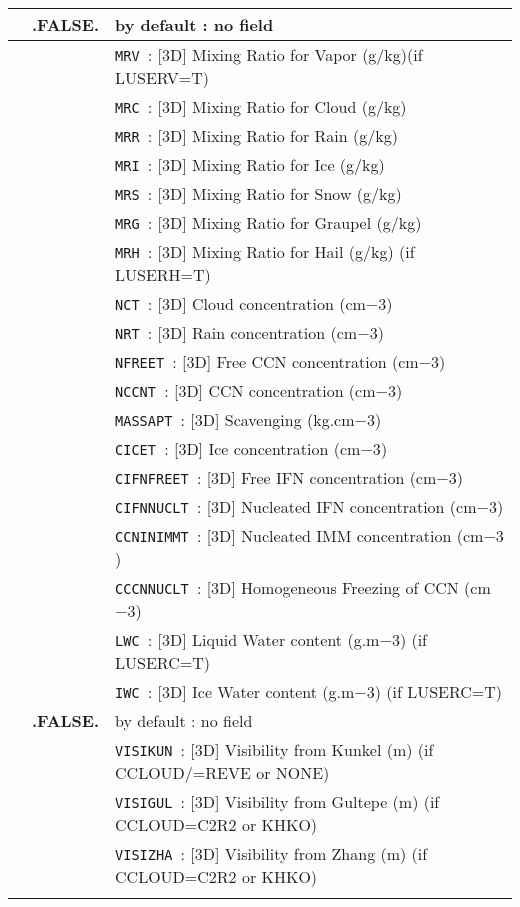\begin{center}
\begin{makeimage}
\begin{tabular}{|>{\centering}p{3cm}|>{\centering}p{2.5cm}|p{11cm}|}
\hline
\multirow{10}{*}{LLIMA\_DIAG}\index{LLIMA\_DIAG!\innam{NAM\_DIAG}}&\textbf{.FALSE.} & by default : no field\\\cline{2-3}
&\multirow{19}{*}{.TRUE.} &{\tt MRV }: [3D] Mixing Ratio for Vapor (g/kg)(if LUSERV=T)\\\cline{3-3}
& &{\tt MRC }: [3D] Mixing Ratio for Cloud (g/kg) \\\cline{3-3}
& &{\tt MRR }: [3D] Mixing Ratio for Rain (g/kg) \\\cline{3-3}
& &{\tt MRI }: [3D] Mixing Ratio for Ice (g/kg)\\\cline{3-3}
& &{\tt MRS }: [3D] Mixing Ratio for Snow (g/kg)\\\cline{3-3}
& &{\tt MRG }: [3D] Mixing Ratio for Graupel (g/kg) \\\cline{3-3}
& &{\tt MRH }: [3D] Mixing Ratio for Hail (g/kg) (if LUSERH=T)\\\cline{3-3}
& &{\tt NCT }: [3D] Cloud concentration (cm${-3}$)\\\cline{3-3}
& &{\tt NRT }: [3D] Rain concentration (cm${-3}$)\\\cline{3-3}
& &{\tt NFREET }: [3D] Free CCN concentration (cm${-3}$)\\\cline{3-3}
& &{\tt NCCNT }: [3D] CCN concentration (cm${-3}$)\\\cline{3-3}
& &{\tt MASSAPT }: [3D] Scavenging (kg.cm${-3}$)\\\cline{3-3}
& &{\tt CICET }: [3D] Ice concentration (cm${-3}$)\\\cline{3-3}
& &{\tt CIFNFREET }: [3D] Free IFN concentration (cm${-3}$)\\\cline{3-3}
& &{\tt CIFNNUCLT }: [3D] Nucleated IFN concentration (cm${-3}$)\\\cline{3-3}
& &{\tt CCNINIMMT }: [3D] Nucleated IMM concentration (cm${-3}$)\\\cline{3-3}
& &{\tt CCCNNUCLT }: [3D] Homogeneous Freezing of CCN (cm${-3}$)\\\cline{3-3}
& &{\tt LWC }: [3D] Liquid Water content (g.m${-3}$) (if LUSERC=T)\\\cline{3-3}
& &{\tt IWC }: [3D] Ice Water content (g.m${-3}$) (if LUSERC=T)\\\cline{3-3}
\hline
\multirow{10}{*}{LVISI}\index{LVISI!\innam{NAM\_DIAG}}&\textbf{.FALSE.} & by default : no field\\\cline{2-3}
&\multirow{6}{*}{.TRUE.} &{\tt VISIKUN }: [3D] Visibility from Kunkel (m) (if CCLOUD/=REVE or NONE) \\\cline{3-3}
& &{\tt VISIGUL }: [3D] Visibility from Gultepe (m) (if CCLOUD=C2R2 or KHKO)\\\cline{3-3}
& &{\tt VISIZHA }: [3D] Visibility from Zhang (m) (if CCLOUD=C2R2 or KHKO)\\\cline{3-3}
\hline
\end{tabular}
\end{makeimage} 
\end{center}

